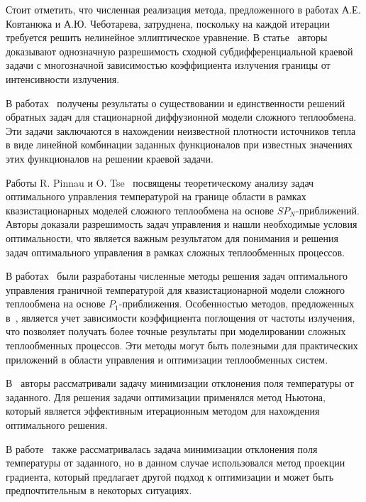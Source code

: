 Стоит отметить, что численная реализация метода, предложенного в работах А.Е. Ковтанюка и А.Ю. Чеботарева,
затруднена, поскольку на каждой итерации требуется решить нелинейное эллиптическое уравнение.
В статье~\cite{Chebotarev2016Odnaznachnaya} авторы доказывают однозначную разрешимость
сходной субдифференциальной краевой задачи с многозначной зависимостью коэффициента излучения
границы от интенсивности излучения.

В работах~\cite{astrakhantseva2017analysis, chebotarev2018inverse} получены результаты о существовании
и единственности решений обратных задач для стационарной диффузионной модели сложного теплообмена.
Эти задачи заключаются в нахождении неизвестной плотности источников тепла в виде линейной комбинации
заданных функционалов при известных значениях этих функционалов на решении краевой задачи.

Работы R. Pinnau и O. Tse~\cite{Pinnau2007, Pinnau2013} посвящены теоретическому анализу задач
оптимального управления температурой на границе области в рамках квазистационарных моделей сложного
теплообмена на основе $SP_N$-приближений.
Авторы доказали разрешимость задач управления и нашли необходимые условия оптимальности,
что является важным результатом для понимания и решения задач оптимального управления
в рамках сложных теплообменных процессов.

В работах~\cite{
    clever2012optimal, clever2014model, lang2005adaptive, frank2011adaptive, Pinnau2007b, Pinnau2013
} были разработаны численные методы решения задач оптимального управления граничной температурой
для квазистационарной модели сложного теплообмена на основе $P_1$-приближения.
Особенностью методов, предложенных в~\cite{clever2012optimal, clever2014model, lang2005adaptive},
является учет зависимости коэффициента поглощения от частоты излучения, что позволяет получать более
точные результаты при моделировании сложных теплообменных процессов.
Эти методы могут быть полезными для практических приложений
в области управления и оптимизации теплообменных систем.


В~\cite{frank2011adaptive, Pinnau2007b} авторы рассматривали задачу
минимизации отклонения поля температуры от заданного.
Для решения задачи оптимизации применялся метод Ньютона,
который является эффективным итерационным методом для нахождения оптимального решения.

В работе~\cite{lang2005adaptive} также рассматривалась задача минимизации
отклонения поля температуры от заданного, но в данном случае использовался метод проекции градиента,
который предлагает другой подход к оптимизации и может быть предпочтительным в некоторых ситуациях.

